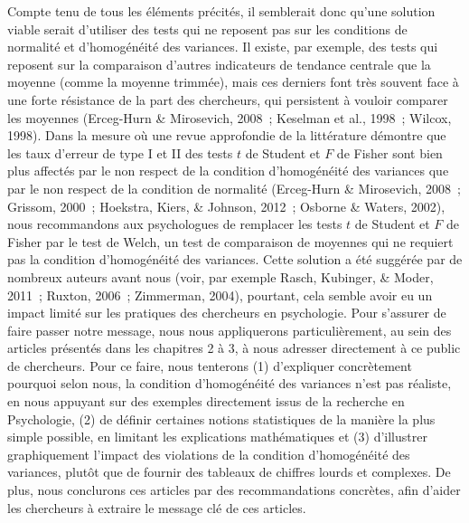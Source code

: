 \documentclass[
  12pt,
  french,
]{article}
\begin{document}
Compte tenu de tous les éléments précités, il semblerait donc qu'une
solution viable serait d'utiliser des tests qui ne reposent pas sur les
conditions de normalité et d'homogénéité des variances. Il existe, par
exemple, des tests qui reposent sur la comparaison d'autres indicateurs
de tendance centrale que la moyenne (comme la moyenne trimmée), mais ces
derniers font très souvent face à une forte résistance de la part des
chercheurs, qui persistent à vouloir comparer les moyennes (Erceg-Hurn
\& Mirosevich, 2008~; Keselman et al., 1998~; Wilcox, 1998). Dans la
mesure où une revue approfondie de la littérature démontre que les taux
d'erreur de type I et II des tests \(t\) de Student et \(F\) de Fisher
sont bien plus affectés par le non respect de la condition d'homogénéité
des variances que par le non respect de la condition de normalité
(Erceg-Hurn \& Mirosevich, 2008~; Grissom, 2000~; Hoekstra, Kiers, \&
Johnson, 2012~; Osborne \& Waters, 2002), nous recommandons aux
psychologues de remplacer les tests \(t\) de Student et \(F\) de Fisher
par le test de Welch, un test de comparaison de moyennes qui ne requiert
pas la condition d'homogénéité des variances. Cette solution a été
suggérée par de nombreux auteurs avant nous (voir, par exemple Rasch,
Kubinger, \& Moder, 2011~; Ruxton, 2006~; Zimmerman, 2004), pourtant,
cela semble avoir eu un impact limité sur les pratiques des chercheurs
en psychologie. Pour s'assurer de faire passer notre message, nous nous
appliquerons particulièrement, au sein des articles présentés dans les
chapitres 2 à 3, à nous adresser directement à ce public de chercheurs.
Pour ce faire, nous tenterons (1) d'expliquer concrètement pourquoi
selon nous, la condition d'homogénéité des variances n'est pas réaliste,
en nous appuyant sur des exemples directement issus de la recherche en
Psychologie, (2) de définir certaines notions statistiques de la manière
la plus simple possible, en limitant les explications mathématiques et
(3) d'illustrer graphiquement l'impact des violations de la condition
d'homogénéité des variances, plutôt que de fournir des tableaux de
chiffres lourds et complexes. De plus, nous conclurons ces articles par
des recommandations concrètes, afin d'aider les chercheurs à extraire le
message clé de ces articles.
\end{document}
